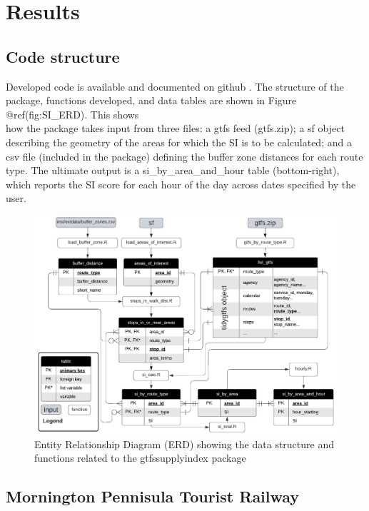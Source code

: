 \documentclass[preprint, 3p,
authoryear]{elsarticle} %
\begin{document}
\hypertarget{results}{%
\section{Results}\label{results}}

\hypertarget{code-structure}{%
\subsection{Code structure}\label{code-structure}}

Developed code is available and documented on github
\citep{gtfssupplyindex_github}. The structure of the package, functions
developed, and data tables are shown in Figure @ref(fig:SI\_ERD). This
shows\\
how the package takes input from three files: a gtfs feed (gtfs.zip); a
sf object describing the geometry of the areas for which the SI is to be
calculated; and a csv file (included in the package) defining the buffer
zone distances for each route type. The ultimate output is a
si\_by\_area\_and\_hour table (bottom-right), which reports the SI score
for each hour of the day across dates specified by the user.

\begin{figure}
\includegraphics[width=1\linewidth]{graphics/SI_data_structure} \caption{Entity Relationship Diagram (ERD) showing the data structure and functions related to the gtfssupplyindex package}\label{fig:SI_ERD}
\end{figure}

\hypertarget{mornington-pennisula-tourist-railway}{%
\subsection{Mornington Pennisula Tourist
Railway}\label{mornington-pennisula-tourist-railway}}
\end{document}
